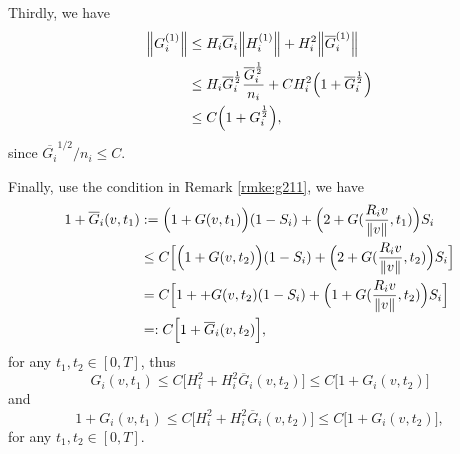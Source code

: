 \documentclass[a4paper, 11pt]{article}
\theoremstyle{plain}
\theoremstyle{remark}
\theoremstyle{definition}
\begin{document}
Thirdly, we have
\begin{equation}
\begin{aligned}
    \norm{G_i^{(1)}}&\leq H_i\overline{G}_i \norm{H_i^{(1)}}+H_i^2\norm{\overline{G}^{(1)}_i}\\
    &\leq H_i\overline{G}_i^{\frac{1}{2}} \frac{\overline{G}_i^{\frac{1}{2}}}{n_i}+CH_i^2\Big(1+\overline{G}^{\frac{1}{2}}_i\Big)\\
    &\leq C\Big(1+G_i^{\frac{1}{2}}\Big),
\end{aligned}
\end{equation}
since $\overline{G_i}^{1/2}/n_i\leq C$.

Finally, use the condition in Remark \ref{rmke:g211}, we have 
\begin{equation}
    \begin{aligned}
        1+\overline{G}_i(v,t_1)&:=\Big(1+G(v,t_1)\Big)(1-S_i)+\Big(2+G(\frac{R_iv}{\norm{v}},t_1)\Big)S_i\\
        &\leq C\Big[\Big(1+G(v,t_2)\Big)(1-S_i)+\Big(2+G(\frac{R_iv}{\norm{v}},t_2)\Big)S_i\Big]\\
        &=C\Big[1++G(v,t_2)(1-S_i)+\Big(1+G(\frac{R_iv}{\norm{v}},t_2)\Big)S_i\Big]\\
        &=:C\Big[1+\overline{G}_i(v,t_2)\Big],
    \end{aligned}
\end{equation}
for any $t_1,t_2\in [0,T]$, thus 
\begin{equation}
    G_i(v,t_1)\leq C\Big[H_i^2+H_i^2\overline{G}_i(v,t_2)\Big]\leq C\Big[1+G_i(v,t_2)\Big]
\end{equation}
and 
\begin{equation}
    1+G_i(v,t_1)\leq C\Big[H_i^2+H_i^2\overline{G}_i(v,t_2)\Big]\leq C\Big[1+G_i(v,t_2)\Big],
\end{equation}
for any $t_1,t_2\in [0,T]$.
\end{document}
